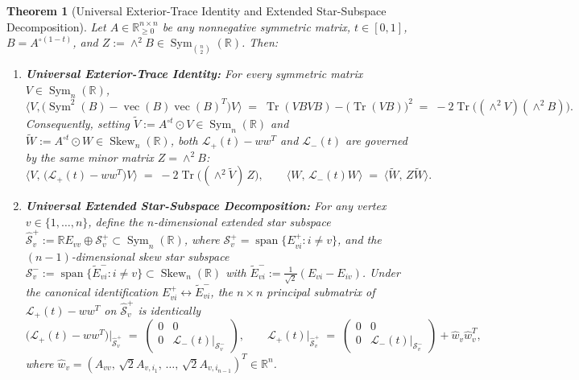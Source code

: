 \documentclass[11pt,a4paper]{article}
\theoremstyle{plain}
\newtheorem{theorem}{Theorem}[section]
\theoremstyle{definition}
\theoremstyle{remark}
\DeclareMathOperator{\Tr}{Tr}
\DeclareMathOperator{\Sym}{Sym}
\DeclareMathOperator{\Skew}{Skew}
\DeclareMathOperator{\vecop}{vec}
\begin{document}
\begin{theorem}[Universal Exterior-Trace Identity and Extended Star-Subspace Decomposition]\label{thm:star}
Let $A \in \mathbb{R}_{\ge 0}^{n \times n}$ be any nonnegative symmetric matrix, $t \in [0,1]$, $B = A^{\circ(1-t)}$, and $Z := \wedge^2 B \in \Sym_{\binom{n}{2}}(\mathbb{R})$. Then:
\begin{enumerate}[label=(\alph*)]
  \item \textbf{Universal Exterior-Trace Identity:} For every symmetric matrix $V \in \Sym_n(\mathbb{R})$,
  \begin{equation}\label{eq:exterior_trace}
    \big\langle V, \big(\Sym^2(B) - \vecop(B)\vecop(B)^T\big)V \big\rangle \;=\; \Tr(VBVB) - \big(\Tr(VB)\big)^2 \;=\; -2\Tr\Big((\wedge^2 V)(\wedge^2 B)\Big).
  \end{equation}
  Consequently, setting $\widetilde{V} := A^{\circ t} \odot V \in \Sym_n(\mathbb{R})$ and $\widetilde{W} := A^{\circ t} \odot W \in \Skew_n(\mathbb{R})$, both $\mathcal{L}_+(t) - w w^T$ and $\mathcal{L}_-(t)$ are governed by the same minor matrix $Z = \wedge^2 B$:
  \[
    \big\langle V, \, \big(\mathcal{L}_+(t) - w w^T\big)V \big\rangle \;=\; -2\Tr\big((\wedge^2 \widetilde{V})\, Z\big), \qquad \big\langle W, \, \mathcal{L}_-(t)W \big\rangle \;=\; \big\langle \widetilde{W}, \, Z \widetilde{W} \big\rangle.
  \]
  \item \textbf{Universal Extended Star-Subspace Decomposition:} For any vertex $v \in \{1,\dots,n\}$, define the $n$-dimensional extended star subspace $\widehat{\mathcal{S}}_v^+ := \mathbb{R} E_{vv} \oplus \mathcal{S}_v^+ \subset \Sym_n(\mathbb{R})$, where $\mathcal{S}_v^+ = \operatorname{span}\{E_{vi}^+ : i \ne v\}$, and the $(n-1)$-dimensional skew star subspace $\mathcal{S}_v^- := \operatorname{span}\{\widetilde{E}_{vi}^- : i \ne v\} \subset \Skew_n(\mathbb{R})$ with $\widetilde{E}_{vi}^- := \frac{1}{\sqrt{2}}(E_{vi} - E_{iv})$. Under the canonical identification $E_{vi}^+ \leftrightarrow \widetilde{E}_{vi}^-$, the $n \times n$ principal submatrix of $\mathcal{L}_+(t) - w w^T$ on $\widehat{\mathcal{S}}_v^+$ is identically
  \begin{equation}\label{eq:star_decomp}
    \boxed{\big(\mathcal{L}_+(t) - w w^T\big)\Big|_{\widehat{\mathcal{S}}_v^+} \;=\; \begin{pmatrix} 0 & 0 \\ 0 & \mathcal{L}_-(t)\big|_{\mathcal{S}_v^-} \end{pmatrix}, \qquad \mathcal{L}_+(t)\big|_{\widehat{\mathcal{S}}_v^+} \;=\; \begin{pmatrix} 0 & 0 \\ 0 & \mathcal{L}_-(t)\big|_{\mathcal{S}_v^-} \end{pmatrix} + \widehat{w}_v \widehat{w}_v^T,}
  \end{equation}
  where $\widehat{w}_v = (A_{vv}, \, \sqrt{2}A_{v,i_1}, \, \dots, \, \sqrt{2}A_{v,i_{n-1}})^T \in \mathbb{R}^n$.
\end{enumerate}
\end{theorem}
\end{document}

